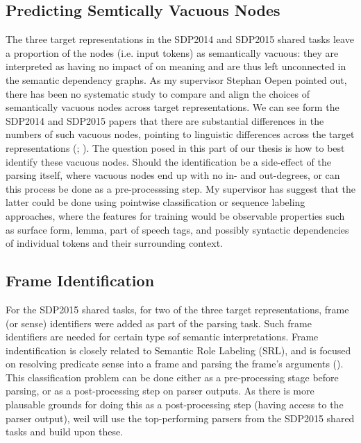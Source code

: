 \documentclass[10pt]{article}
\begin{document}
\subsection{Predicting Semtically Vacuous Nodes}
The three target representations in the SDP2014 and SDP2015 shared tasks leave a proportion of the nodes (i.e. input tokens) as semantically vacuous: they are interpreted as having no impact of on meaning and are thus left unconnected in the semantic dependency graphs. As my supervisor Stephan Oepen pointed out, there has been no systematic study to compare and align the choices of semantically vacuous nodes across target representations. We can see form the SDP2014 and SDP2015 papers that there are substantial differences in the numbers of such vacuous nodes, pointing to linguistic differences across the target representations (\cite{semeval2014}; \cite{semeval2015}). The question posed in this part of our thesis is how to best identify these vacuous nodes. Should the identification be a side-effect of the parsing itself, where vacuous nodes end up with no in- and out-degrees, or can this process be done as a pre-processsing step. My supervisor has suggest that the latter could be done using pointwise classification or sequence labeling approaches, where the features for training would be observable properties such as surface form, lemma, part of speech tags, and possibly syntactic dependencies of individual tokens and their surrounding context. 

\subsection{Frame Identification}
For the SDP2015 shared tasks, for two of the three target representations, frame (or sense) identifiers were added as part of the parsing task. Such frame identifiers are needed for certain type sof semantic interpretations. Frame indentification is closely related to Semantic Role Labeling (SRL), and is focused on resolving predicate sense into a frame and parsing the frame's arguments (\cite{frame-identification}). This classification problem can be done either as a pre-processing stage before parsing, or as a post-processing step on parser outputs. As there is more plausable grounds for doing this as a post-processing step (having access to the parser output), weil will use the top-performing parsers from the SDP2015 shared tasks and build upon these. 
\end{document}
